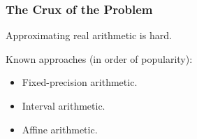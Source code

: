 \begin{frame}

\frametitle{The Crux of the Problem}

\vspace{\fill}

\begin{center}

Approximating real arithmetic is hard.

\end{center}

\vspace{\fill}

Known approaches (in order of popularity):

\begin{itemize}

\item Fixed-precision arithmetic.

\item Interval arithmetic.

\item Affine arithmetic.

\end{itemize}

\end{frame}
